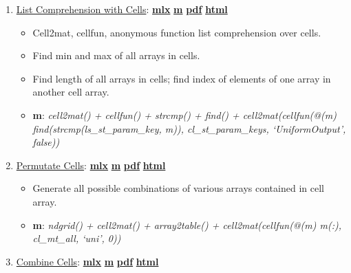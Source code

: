 \documentclass[
]{book}
\providecommand{\tightlist}{%
  \setlength{\itemsep}{0pt}\setlength{\parskip}{0pt}}
\begin{document}
\begin{enumerate}
\def\labelenumi{\arabic{enumi}.}
\tightlist
\item
  \href{https://fanwangecon.github.io/M4Econ/amto/cell/htmlpdfm/fs_cellfuns.html}{List Comprehension with Cells}: \href{https://github.com/FanWangEcon/M4Econ/blob/master/amto/cell/fs_cellfuns.mlx}{\textbf{mlx}} \textbar{} \href{https://github.com/FanWangEcon/M4Econ/blob/master/amto/cell/htmlpdfm/fs_cellfuns.m}{\textbf{m}} \textbar{} \href{https://github.com/FanWangEcon/M4Econ/blob/master/amto/cell/htmlpdfm/fs_cellfuns.pdf}{\textbf{pdf}} \textbar{} \href{https://fanwangecon.github.io/M4Econ/amto/cell/htmlpdfm/fs_cellfuns.html}{\textbf{html}}

  \begin{itemize}
  \tightlist
  \item
    Cell2mat, cellfun, anonymous function list comprehension over cells.
  \item
    Find min and max of all arrays in cells.
  \item
    Find length of all arrays in cells; find index of elements of one array in another cell array.
  \item
    \textbf{m}: \emph{cell2mat() + cellfun() + strcmp() + find() + cell2mat(cellfun(@(m) find(strcmp(ls\_st\_param\_key, m)), cl\_st\_param\_keys, `UniformOutput', false))}
  \end{itemize}
\item
  \href{https://fanwangecon.github.io/M4Econ/amto/cell/htmlpdfm/fs_cellscombinations.html}{Permutate Cells}: \href{https://github.com/FanWangEcon/M4Econ/blob/master/amto/cell/fs_cellscombinations.mlx}{\textbf{mlx}} \textbar{} \href{https://github.com/FanWangEcon/M4Econ/blob/master/amto/cell/htmlpdfm/fs_cellscombinations.m}{\textbf{m}} \textbar{} \href{https://github.com/FanWangEcon/M4Econ/blob/master/amto/cell/htmlpdfm/fs_cellscombinations.pdf}{\textbf{pdf}} \textbar{} \href{https://fanwangecon.github.io/M4Econ/amto/cell/htmlpdfm/fs_cellscombinations.html}{\textbf{html}}

  \begin{itemize}
  \tightlist
  \item
    Generate all possible combinations of various arrays contained in cell array.
  \item
    \textbf{m}: \emph{ndgrid() + cell2mat() + array2table() + cell2mat(cellfun(@(m) m(:), cl\_mt\_all, `uni', 0))}
  \end{itemize}
\item
  \href{https://fanwangecon.github.io/M4Econ/amto/cell/htmlpdfm/fs_cellscombine.html}{Combine Cells}: \href{https://github.com/FanWangEcon/M4Econ/blob/master/amto/cell/fs_cellscombine.mlx}{\textbf{mlx}} \textbar{} \href{https://github.com/FanWangEcon/M4Econ/blob/master/amto/cell/htmlpdfm/fs_cellscombine.m}{\textbf{m}} \textbar{} \href{https://github.com/FanWangEcon/M4Econ/blob/master/amto/cell/htmlpdfm/fs_cellscombine.pdf}{\textbf{pdf}} \textbar{} \href{https://fanwangecon.github.io/M4Econ/amto/cell/htmlpdfm/fs_cellscombine.html}{\textbf{html}}


\end{enumerate}
\end{document}
